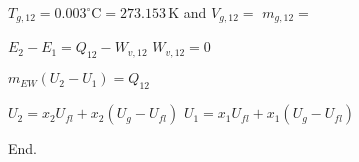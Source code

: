 \( T_{g,12} = 0.003^\circ \text{C} = 273.153 \, \text{K} \) and \( V_{g,12} = \)  
\( m_{g,12} = \)  

\( E_2 - E_1 = Q_{12} - W_{v,12} \)  
\( W_{v,12} = 0 \)  

\( m_{EW} (U_2 - U_1) = Q_{12} \)  

\( U_2 = x_2 U_{fl} + x_2 (U_{g} - U_{fl}) \)  
\( U_1 = x_1 U_{fl} + x_1 (U_{g} - U_{fl}) \)  

End.